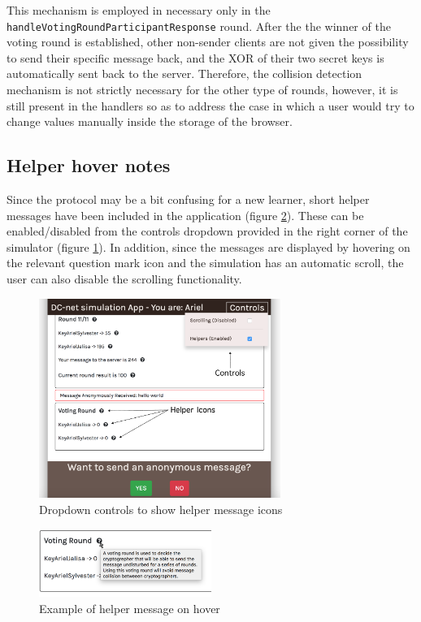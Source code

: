 This mechanism is employed in necessary only in the \lstinline{handleVotingRoundParticipantResponse} round. After the the winner of the voting round is established, other non-sender clients are not given the possibility to send their specific message back, and the XOR of their two secret keys is automatically sent back to the server. Therefore, the collision detection mechanism is not strictly necessary for the other type of rounds, however, it is still present in the handlers so as to address the case in which a user would try to change values manually inside the storage of the browser.


\subsection{Helper hover notes}
Since the protocol may be a bit confusing for a new learner, short helper messages have been included in the application (figure \ref{fig:helperMessageExample}). These can be enabled/disabled from the controls dropdown provided in the right corner of the simulator (figure \ref{fig:controlsDropdown}). In addition, since the messages are displayed by hovering on the relevant question mark icon and the simulation has an automatic scroll, the user can also disable the scrolling functionality.

\begin{figure}[H]
    \centering
    \includegraphics[width=0.70\textwidth]{Images/Implementation/controlsDropdown.png}
    \caption{Dropdown controls to show helper message icons}
    \label{fig:controlsDropdown}
\end{figure}

\begin{figure}[H]
    \centering
    \includegraphics[width=0.50\textwidth]{Images/Implementation/helperMessageExample.png}
    \caption{Example of helper message on hover}
    \label{fig:helperMessageExample}
\end{figure}




